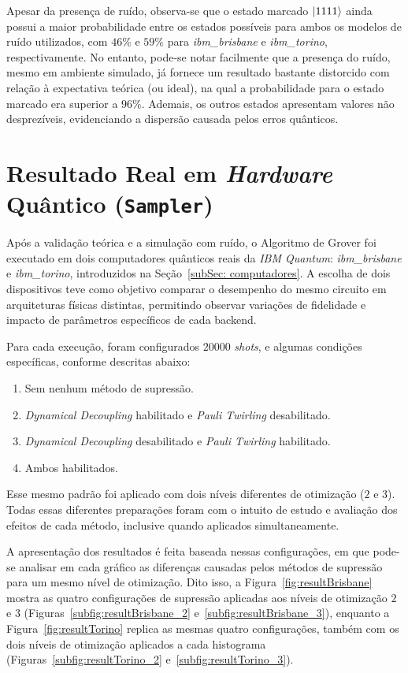 Apesar da presença de ruído, observa-se que o estado marcado $\ket{1111}$ ainda possui a maior probabilidade entre os estados possíveis para ambos os modelos de ruído utilizados, com $46\%$ e $59\%$ para \textit{ibm\_brisbane} e \textit{ibm\_torino}, respectivamente. No entanto, pode-se notar facilmente que a presença do ruído, mesmo em ambiente simulado, já fornece um resultado bastante distorcido com relação à expectativa teórica (ou ideal), na qual a probabilidade para o estado marcado era superior a $96\%$. Ademais, os outros estados apresentam valores não desprezíveis, evidenciando a dispersão causada pelos erros quânticos.

\section{Resultado Real em \textit{Hardware} Quântico (\texttt{Sampler})}
\label{sec: resultReal}

Após a validação teórica e a simulação com ruído, o Algoritmo de Grover foi executado em dois computadores quânticos reais da \textit{IBM Quantum}: \textit{ibm\_brisbane} e \textit{ibm\_torino}, introduzidos na Seção~\ref{subSec: computadores}. A escolha de dois dispositivos teve como objetivo comparar o desempenho do mesmo circuito em arquiteturas físicas distintas, permitindo observar variações de fidelidade e impacto de parâmetros específicos de cada backend.

Para cada execução, foram configurados $20000$ \textit{shots}, e algumas condições específicas, conforme descritas abaixo:

\begin{enumerate}
    \item Sem nenhum método de supressão.
    \item \textit{Dynamical Decoupling} habilitado e \textit{Pauli Twirling} desabilitado.
    \item \textit{Dynamical Decoupling} desabilitado e \textit{Pauli Twirling} habilitado.
    \item Ambos habilitados.
\end{enumerate}

Esse mesmo padrão foi aplicado com dois níveis diferentes de otimização ($2$ e $3$). Todas essas diferentes preparações foram com o intuito de estudo e avaliação dos efeitos de cada método, inclusive quando aplicados simultaneamente.

A apresentação dos resultados é feita baseada nessas configurações, em que pode-se analisar em cada gráfico as diferenças causadas pelos métodos de supressão para um mesmo nível de otimização. Dito isso, a Figura~\ref{fig:resultBrisbane} mostra as quatro configurações de supressão aplicadas aos níveis de otimização $2$ e $3$ (Figuras~\ref{subfig:resultBrisbane_2} e~\ref{subfig:resultBrisbane_3}), enquanto a Figura~\ref{fig:resultTorino} replica as mesmas quatro configurações, também com os dois níveis de otimização aplicados a cada histograma (Figuras~\ref{subfig:resultTorino_2} e~\ref{subfig:resultTorino_3}). 

